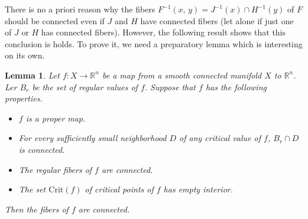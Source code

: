 \documentclass[11pt]{article}
\newtheorem{lemma}[theorem]{Lemma}
\begin{document}
There is no a priori reason why the fibers $F^{-1}(x,\,y)= J^{-1}(x)
\cap H^{-1}(y)$ of $F$ should be connected even if $J$ and $H$ have
connected fibers (let alone if just one of $J$ or $H$ has connected
fibers). However, the following result shows that this conclusion is
holds. To prove it, we need a preparatory lemma which is interesting
on its own.



\begin{lemma} \label{tricky} Let $f:X \to \mathbb{R}^n$ be a map from
  a smooth connected manifold $X$ to $\mathbb{R}^n$. Ler $B_r$ be the
  set of regular values of $f$. Suppose that $f$ has the following
  properties.
  \begin{itemize}
  \item[{\rm (1)}] $f$ is a proper map.
  \item[{\rm (2)}] For every sufficiently small neighborhood $D$ of
    any critical value of $f$, $B_r \cap D$ is connected.
  \item[{\rm (3)}] The regular fibers of $f$ are connected.
  \item[{\rm (4)}] The set $\mathrm{Crit}(f)$ of critical points of
    $f$ has empty interior.
  \end{itemize}
  Then the fibers of $f$ are connected.
\end{lemma}
\end{document}
